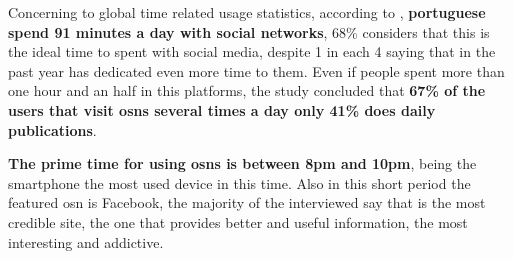 \indent Concerning to global time related usage statistics, according to \cite{marktest2016}, \textbf{portuguese spend 91 minutes a day with social networks},
68\% considers that this is the ideal time to spent with social media, despite 1 in each 4 saying that in the past year has dedicated even more time to them.
Even if people spent more than one hour and an half in this platforms, the study
concluded that \textbf{67\% of the users that visit \glspl{osn} several times a day only 41\% does daily publications}.

\indent \textbf{The prime time for using \glspl{osn} is between 8pm and 10pm}, being the smartphone the most used device in this time. Also in this short period the
featured \gls{osn} is Facebook, the majority of the interviewed say that is the most credible site, the one that provides better and useful information,
the most interesting and addictive.

